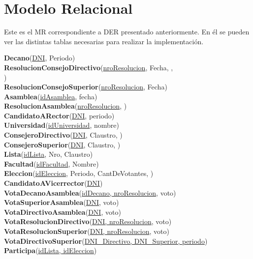 \section{Modelo Relacional}
Este es el MR correspondiente a DER presentado anteriormente. En él se pueden ver las distintas tablas necesarias para realizar la implementación.


\noindent \textbf{Decano}(\underline{DNI}, Periodo) \\
\textbf{ResolucionConsejoDirectivo}(\underline{nroResolucion}, Fecha, , \\)\\
\textbf{ResolucionConsejoSuperior}(\underline{nroResolucion}, Fecha)\\
\textbf{Asamblea}(\underline{idAsamblea}, fecha)\\
\textbf{ResolucionAsamblea}(\underline{nroResolucion}, )\\
\textbf{CandidatoARector}(\underline{DNI}, periodo)\\
\textbf{Universidad}(\underline{idUniversidad}, nombre)\\
\textbf{ConsejeroDirectivo}(\underline{DNI}, Claustro, )\\
\textbf{ConsejeroSuperior}(\underline{DNI}, Claustro, )\\
\textbf{Lista}(\underline{idLista}, Nro, Claustro)\\
\textbf{Facultad}(\underline{idFacultad}, Nombre)\\
\textbf{Eleccion}(\underline{idEleccion}, Periodo, CantDeVotantes, )\\
\textbf{CandidatoAVicerrector}(\underline{DNI})\\
\textbf{VotaDecanoAsamblea}(\underline{idDecano, nroResolucion}, voto)\\
\textbf{VotaSuperiorAsamblea}(\underline{DNI}, voto)\\
\textbf{VotaDirectivoAsamblea}(\underline{DNI}, voto)\\
\textbf{VotaResolucionDirectivo}(\underline{DNI, nroResolucion}, voto)\\
\textbf{VotaResolucionSuperior}(\underline{DNI, nroResolucion}, voto)\\
\textbf{VotaDirectivoSuperior}(\underline{DNI\_Directivo, DNI\_Superior, periodo})\\
\textbf{Participa}(\underline{idLista, idEleccion})\\


